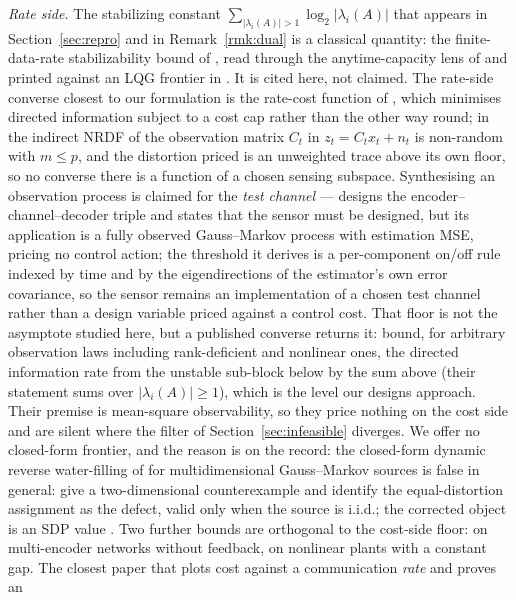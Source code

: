 \emph{Rate side.} The stabilizing constant
$\sum_{|\lambda_i(A)|>1}\log_2|\lambda_i(A)|$ that appears in
Section~\ref{sec:repro} and in Remark~\ref{rmk:dual} is a classical quantity: the
finite-data-rate stabilizability bound of \cite{nair2004stabilizability}, read
through the anytime-capacity lens of \cite{sahai2006anytime} and printed against an
LQG frontier in \cite{sabag2021reducing}. It is cited here, not claimed. The
rate-side converse closest to our formulation is the rate-cost function of
\cite{kostina2019rate},
which minimises directed information subject to a cost cap rather than the other
way round; in the indirect NRDF of \cite{stavrou2019indirect} the observation
matrix $C_t$ in $z_t=C_tx_t+n_t$ is non-random with $m\le p$, and the distortion
priced is an unweighted trace above its own floor, so no converse there is a
function of a chosen sensing subspace. Synthesising an observation process is
claimed for the \emph{test channel} --- \cite{stavrou2016estimation} designs the
encoder--channel--decoder triple and states that the sensor must be designed,
but its application is a fully observed Gauss--Markov process with estimation MSE,
pricing no control action; the threshold it derives is a per-component on/off rule
indexed by time and by the eigendirections of the estimator's own error covariance,
so the sensor remains an implementation of a chosen test channel rather than a
design variable priced against a control cost. That floor is not the asymptote studied here, but a
published converse returns it: \cite{li2026sensing} bound, for arbitrary
observation laws including rank-deficient and nonlinear ones, the directed
information rate from the unstable sub-block below by the sum above (their
statement sums over $|\lambda_i(A)|\ge1$), which is the level our designs
approach. Their premise is mean-square observability, so they price nothing on the
cost side and are silent where the filter of Section~\ref{sec:infeasible}
diverges. We offer no closed-form frontier, and the reason is on the record: the
closed-form dynamic reverse water-filling of \cite{tatikonda2004stochastic} for
multidimensional Gauss--Markov sources is false in general:
\cite{stavrou2017revisited} give a two-dimensional counterexample and identify the
equal-distortion assignment as the defect, valid only when the source is i.i.d.;
the corrected object is an SDP value \cite{tanaka2017srd}. Two further bounds are
orthogonal to the cost-side floor: \cite{li2026lower} on multi-encoder networks
without feedback, \cite{atay2026rate} on nonlinear plants with a constant gap. The
closest paper that plots cost against a communication \emph{rate} and proves an
